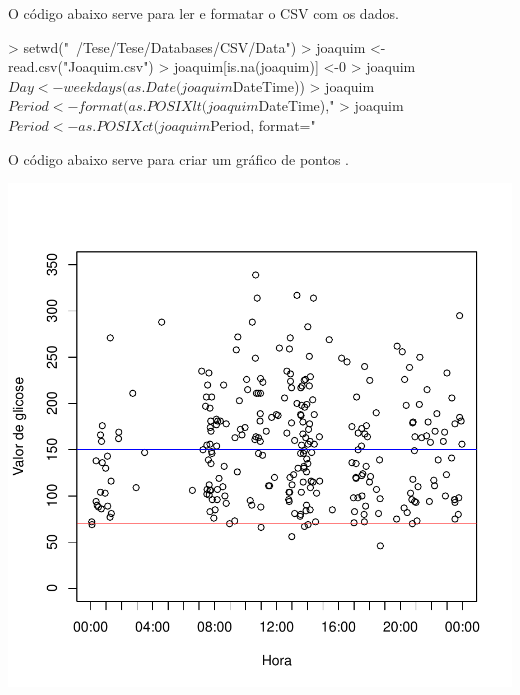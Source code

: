 \documentclass{article}
\begin{document}


O código abaixo serve para ler e formatar o CSV com os dados.
\begin{Schunk}
\begin{Sinput}
> setwd("~/Tese/Tese/Databases/CSV/Data")
> joaquim <- read.csv("Joaquim.csv")
> joaquim[is.na(joaquim)] <-0
> joaquim$Day <- weekdays(as.Date(joaquim$DateTime))
> joaquim$Period <- format(as.POSIXlt(joaquim$DateTime),"%
> joaquim$Period <- as.POSIXct(joaquim$Period, format="%
\end{Sinput}
\end{Schunk}

O código abaixo serve para criar um gráfico de pontos .
\begin{Schunk}
\end{Schunk}
\includegraphics{Example-002}
\end{document}
